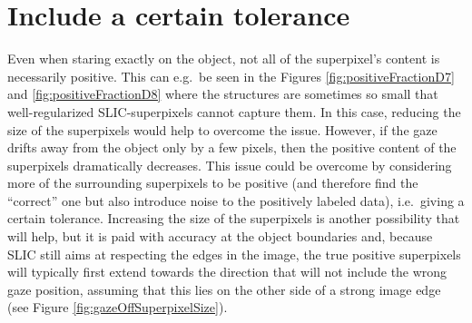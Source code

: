 \section{Include a certain tolerance}
Even when staring exactly on the object, not all of the superpixel's content is necessarily positive. 
This can e.g.\ be seen in the Figures \ref{fig:positiveFractionD7} and \ref{fig:positiveFractionD8} where the structures are sometimes so small that well-regularized SLIC-superpixels cannot capture them. 
In this case, reducing the size of the superpixels would help to overcome the issue. 
However, if the gaze drifts away from the object only by a few pixels, then the positive content of the superpixels dramatically decreases. 
This issue could be overcome by considering more of the surrounding superpixels to be positive (and therefore find the ``correct'' one but also introduce noise to the positively labeled data), i.e.\ giving a certain tolerance. 
Increasing the size of the superpixels is another possibility that will help, but it is paid with accuracy at the object boundaries and, because SLIC still aims at respecting the edges in the image, the true positive superpixels will typically first extend towards the direction that will not include the wrong gaze position, assuming that this lies on the other side of a strong image edge (see Figure \ref{fig:gazeOffSuperpixelSize}).

